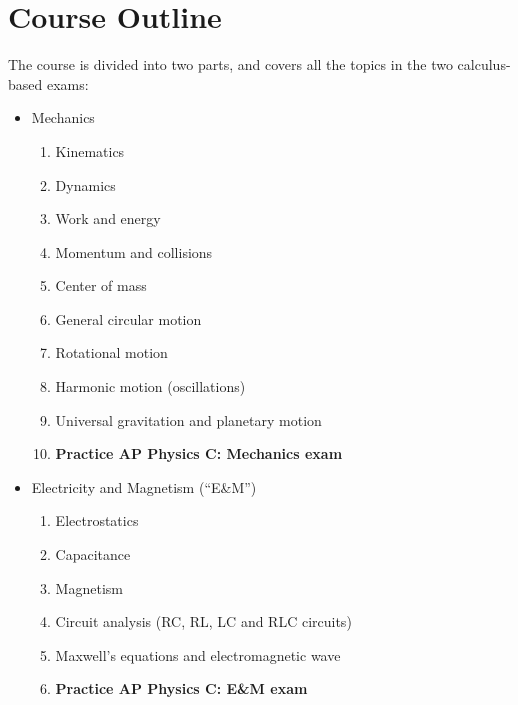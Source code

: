 \documentclass{../../oss-handout}
\begin{document}
\section*{Course Outline}
The course is divided into two parts, and covers all the topics in the two
calculus-based exams:
\begin{itemize}[noitemsep,topsep=0pt]
\item Mechanics
  \begin{enumerate}[noitemsep,topsep=0pt]
  \item Kinematics
  \item Dynamics
  \item Work and energy
  \item Momentum and collisions
  \item Center of mass
  \item General circular motion
  \item Rotational motion
  \item Harmonic motion (oscillations)
  \item Universal gravitation and planetary motion
  \item\textbf{Practice AP Physics C: Mechanics exam}
  \end{enumerate}
\item Electricity and Magnetism (``E\&M'')
  \begin{enumerate}[noitemsep,topsep=0pt,resume]
  \item Electrostatics
  \item Capacitance
  \item Magnetism
  \item Circuit analysis (RC, RL, LC and RLC circuits)
  \item Maxwell's equations and electromagnetic wave
  \item\textbf{Practice AP Physics C: E\&M exam}
  \end{enumerate}
\end{itemize}
\end{document}
